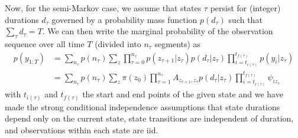 \documentclass[11pt]{article}
\begin{document}
Now, for the semi-Markov case, we assume that states $\tau$ persist for (integer) durations $d_\tau$ governed by a probability mass function $p(d_\tau)$ such that $\sum_{\tau} d_{\tau} = T$. We can then write the marginal probability of the observation sequence over all time $T$ (divided into $n_\tau$ segments) as
\begin{align}
    p(y_{1:T}) &= \sum_{n_\tau} p(n_\tau)\sum_z \prod_{\tau = 0}^{n_\tau} p(z_{\tau+1}|z_\tau) p(d_{\tau}|z_{\tau})
    \prod_{i = t_{i(\tau)}}^{t_{f(\tau)}} p(y_i|z_\tau) \\
    &= \sum_{n_\tau} p(n_\tau) \sum_z \pi(z_0) \prod_{\tau = 1}^{n_\tau} A_{z_{\tau+1}, z_{\tau}} p(d_{\tau}|z_{\tau})\prod_{i = t_{i(\tau)}}^{t_{f(\tau)}} \psi_{iz_{\tau}}
\end{align}
with $t_{i(\tau)}$ and $t_{f(\tau)}$ the start and end points of the given state and we have made the strong conditional independence assumptions that state durations depend only on the current state, state transitions are independent of duration, and observations within each state are iid.
\end{document}
